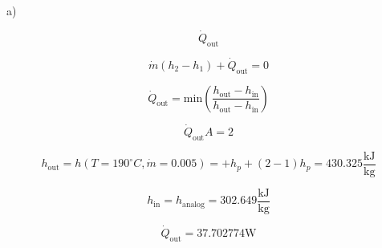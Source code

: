 a)

\[
\dot{Q}_{\text{out}}
\]

\[
\dot{m}(h_2 - h_1) + \dot{Q}_{\text{out}} = 0
\]

\[
\dot{Q}_{\text{out}} = \text{min} \left( \frac{h_{\text{out}} - h_{\text{in}}}{h_{\text{out}} - h_{\text{in}}} \right)
\]

\[
\dot{Q}_{\text{out}} A = 2
\]

\[
h_{\text{out}} = h(T = 190^\circ C, \dot{m} = 0.005) = + h_p + (2-1) h_p = 430.325 \frac{\text{kJ}}{\text{kg}}
\]

\[
h_{\text{in}} = h_{\text{analog}} = 302.649 \frac{\text{kJ}}{\text{kg}}
\]

\[
\dot{Q}_{\text{out}} = 37.702774 \text{W}
\]